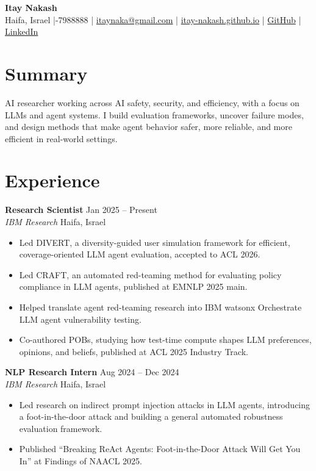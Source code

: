 \documentclass[10pt]{article}
\newcommand{\entry}[4]{%
  \textbf{#1} \hfill #2\\%
  \emph{#3} \hfill #4%
}
\begin{document}
\small

\begin{center}
  {\LARGE \textbf{Itay Nakash}}\\
  Haifa, Israel \;|-7988888 \;|\;
  \href{mailto:itaynaka@gmail.com}{itaynaka@gmail.com} \;|\;
  \href{https://itay-nakash.github.io}{itay-nakash.github.io} \;|\;
  \href{https://github.com/itay-nakash}{GitHub} \;|\;
  \href{https://www.linkedin.com/in/itay-nakash/}{LinkedIn}
\end{center}

\section*{Summary}
AI researcher working across AI safety, security, and efficiency, with a focus on LLMs and agent systems. I build evaluation frameworks, uncover failure modes, and design methods that make agent behavior safer, more reliable, and more efficient in real-world settings.

\section*{Experience}
\entry{Research Scientist}{Jan 2025 -- Present}{IBM Research}{Haifa, Israel}
\begin{itemize}
  \item Led DIVERT, a diversity-guided user simulation framework for efficient, coverage-oriented LLM agent evaluation, accepted to ACL 2026.
  \item Led CRAFT, an automated red-teaming method for evaluating policy compliance in LLM agents, published at EMNLP 2025 main.
  \item Helped translate agent red-teaming research into IBM watsonx Orchestrate LLM agent vulnerability testing.
  \item Co-authored POBs, studying how test-time compute shapes LLM preferences, opinions, and beliefs, published at ACL 2025 Industry Track.
\end{itemize}

\entry{NLP Research Intern}{Aug 2024 -- Dec 2024}{IBM Research}{Haifa, Israel}
\begin{itemize}
  \item Led research on indirect prompt injection attacks in LLM agents, introducing a foot-in-the-door attack and building a general automated robustness evaluation framework.
  \item Published ``Breaking ReAct Agents: Foot-in-the-Door Attack Will Get You In'' at Findings of NAACL 2025.
\end{itemize}
\end{document}
